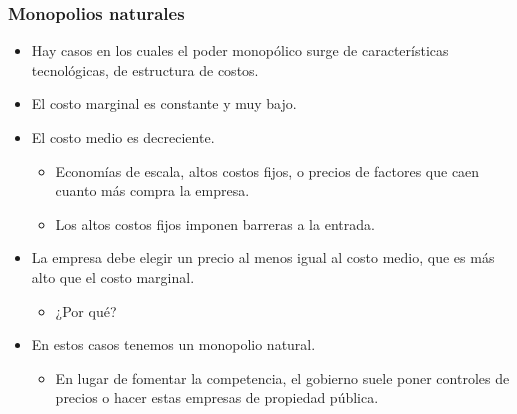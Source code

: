 \documentclass{beamer}
\begin{document}
\begin{frame}
\frametitle{Monopolios naturales}
\begin{itemize}
    \item Hay casos en los cuales el poder monopólico surge de características tecnológicas, de estructura de costos.\vspace{1mm}
    \item El costo marginal es constante y muy bajo. \vspace{1mm}
    \item El costo medio es decreciente. 
        \begin{itemize}
            \item Economías de escala, altos costos fijos, o precios de factores que caen cuanto más compra la empresa.
            \item Los altos costos fijos imponen barreras a la entrada. \vspace{1mm}
        \end{itemize}
        \item La empresa debe elegir un precio al menos igual al costo medio, que es más alto que el costo marginal. 
        \begin{itemize}
            \item ¿Por qué? \vspace{1mm}
        \end{itemize}
        \item En estos casos tenemos un monopolio natural.
        \begin{itemize}
            \item En lugar de fomentar la competencia, el gobierno suele poner controles de precios o hacer estas empresas de propiedad pública.
        \end{itemize}
    \end{itemize}
\end{frame}
\end{document}
